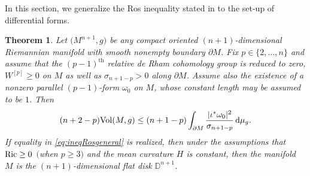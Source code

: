\documentclass[pdftex]{sigma}
\numberwithin{equation}{section}
\newtheorem{Theorem}{Theorem}[section]
\begin{document}
In this section, we generalize the Ros i\-ne\-qua\-li\-ty stated in \cite[Theorem 1]{Ros87} to the set-up of differential forms.
\begin{Theorem}\label{t:Rosgeneral}
Let $\bigl(M^{n+1},g\bigr)$ be any compact oriented $(n+1)$-dimensional Riemannian manifold with smooth nonempty boundary $\partial M$.
Fix $p\in\{2,\dots,n\}$  and assume that the $(p-1)^{\textrm{th}}$ relative de Rham cohomology group is reduced to zero, $W^{[p]}\geq0$ on $M$ as well as $\sigma_{n+1-p}>0$ along $\partial M$.
Assume also the existence of a nonzero parallel $(p-1)$-form $\omega_0$ on $M$, whose constant length may be assumed to be $1$.
Then
\begin{equation}\label{eq:ineqRosgeneral}
(n+2-p)\mathrm{Vol}(M,g)\leq(n+1-p)\int_{\partial M}\frac{|\iota^*\omega_0|^2}{\sigma_{n+1-p}}\,{\rm d}\mu_g.
\end{equation}
If equality in \eqref{eq:ineqRosgeneral} is realized, then under the assumptions that ${\rm Ric}\geq 0$ $($when $p\geq 3)$ and the mean curvature $H$ is constant, then the manifold $M$ is the $(n+1)$-dimensional flat disk $\mathbb{D}^{n+1}$.
\end{Theorem}
\end{document}
